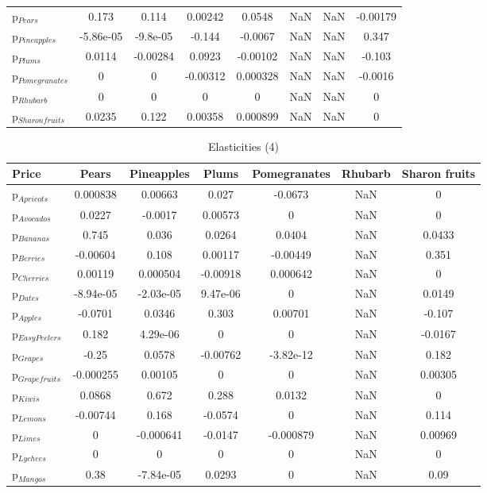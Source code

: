 \documentclass[11pt]{article}
\begin{document}
\begin{table}[h]
\begin{center}
\begin{tabular}{lccccccc}
p$_{Pears}$ &0.173 &0.114 &0.00242 &0.0548 &NaN &NaN &-0.00179 \\
p$_{Pineapples}$ &-5.86e-05 &-9.8e-05 &-0.144 &-0.0067 &NaN &NaN &0.347 \\
p$_{Plums}$ &0.0114 &-0.00284 &0.0923 &-0.00102 &NaN &NaN &-0.103 \\
p$_{Pomegranates}$ &0 &0 &-0.00312 &0.000328 &NaN &NaN &-0.0016 \\
p$_{Rhubarb}$ &0 &0 &0 &0 &NaN &NaN &0 \\
p$_{Sharon fruits}$ &0.0235 &0.122 &0.00358 &0.000899 &NaN &NaN &0 \\
\end{tabular}
\end{center}
\end{table}
\begin{table}[h]
\caption{Elasticities (4)}
\label{table:elasticities 4}
\begin{center}
\begin{tabular}{lcccccc} \hline \hline
Price &Pears &Pineapples &Plums &Pomegranates &Rhubarb &Sharon fruits \\ \hline
p$_{Apricots}$ &0.000838 &0.00663 &0.027 &-0.0673 &NaN &0 \\
p$_{Avocados}$ &0.0227 &-0.0017 &0.00573 &0 &NaN &0 \\
p$_{Bananas}$ &0.745 &0.036 &0.0264 &0.0404 &NaN &0.0433 \\
p$_{Berries}$ &-0.00604 &0.108 &0.00117 &-0.00449 &NaN &0.351 \\
p$_{Cherries}$ &0.00119 &0.000504 &-0.00918 &0.000642 &NaN &0 \\
p$_{Dates}$ &-8.94e-05 &-2.03e-05 &9.47e-06 &0 &NaN &0.0149 \\
p$_{Apples}$ &-0.0701 &0.0346 &0.303 &0.00701 &NaN &-0.107 \\
p$_{Easy Peelers}$ &0.182 &4.29e-06 &0 &0 &NaN &-0.0167 \\
p$_{Grapes}$ &-0.25 &0.0578 &-0.00762 &-3.82e-12 &NaN &0.182 \\
p$_{Grapefruits}$ &-0.000255 &0.00105 &0 &0 &NaN &0.00305 \\
p$_{Kiwis}$ &0.0868 &0.672 &0.288 &0.0132 &NaN &0 \\
p$_{Lemons}$ &-0.00744 &0.168 &-0.0574 &0 &NaN &0.114 \\
p$_{Limes}$ &0 &-0.000641 &-0.0147 &-0.000879 &NaN &0.00969 \\
p$_{Lychees}$ &0 &0 &0 &0 &NaN &0 \\
p$_{Mangos}$ &0.38 &-7.84e-05 &0.0293 &0 &NaN &0.09 \\

\end{tabular}
\end{center}
\end{table}
\end{document}

